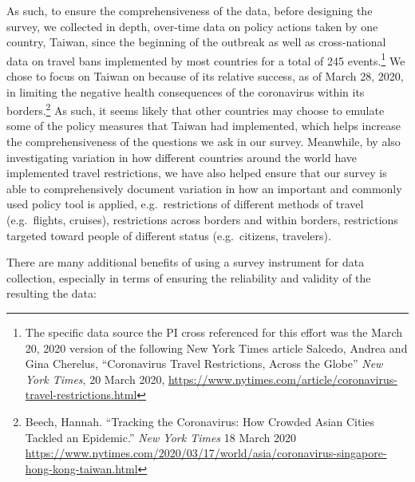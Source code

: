\documentclass[]{article}
\let\rmarkdownfootnote\footnote%
\def\footnote{\protect\rmarkdownfootnote}
\begin{document}
As such, to ensure the comprehensiveness of the data, before designing the survey, we collected in depth, over-time data on policy actions taken by one country, Taiwan, since the beginning of the outbreak as well as cross-national data on travel bans implemented by most countries for a total of 245 events.\footnote{The specific data source the PI cross referenced for this effort was the March 20, 2020 version of the following New York Times article Salcedo, Andrea and Gina Cherelus, ``Coronavirus Travel Restrictions, Across the Globe'' \emph{New York Times}, 20 March 2020, \url{https://www.nytimes.com/article/coronavirus-travel-restrictions.html}} We chose to focus on Taiwan on because of its relative success, as of March 28, 2020, in limiting the negative health consequences of the coronavirus within its borders.\footnote{Beech, Hannah. ``Tracking the Coronavirus: How Crowded Asian Cities Tackled an Epidemic.'' \emph{New York Times} 18 March 2020 \url{https://www.nytimes.com/2020/03/17/world/asia/coronavirus-singapore-hong-kong-taiwan.html}} As such, it seems likely that other countries may choose to emulate some of the policy measures that Taiwan had implemented, which helps increase the comprehensiveness of the questions we ask in our survey. Meanwhile, by also investigating variation in how different countries around the world have implemented travel restrictions, we have also helped ensure that our survey is able to comprehensively document variation in how an important and commonly used policy tool is applied, e.g.~restrictions of different methods of travel (e.g.~flights, cruises), restrictions across borders and within borders, restrictions targeted toward people of different status (e.g.~citizens, travelers).

There are many additional benefits of using a survey instrument for data collection, especially in terms of ensuring the reliability and validity of the resulting the data:
\end{document}

